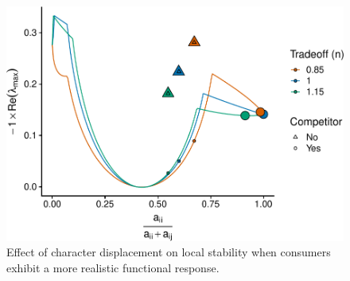 \documentclass[11pt,]{article}
\begin{document}
\begin{figure}
\centering
\includegraphics{manuscript_ECD_model_files/figure-latex/Stability_McCann-1.pdf}
\caption{\label{fig:Stability_McCann}Effect of character displacement on
local stability when consumers exhibit a more realistic functional
response.}
\end{figure}
\end{document}

